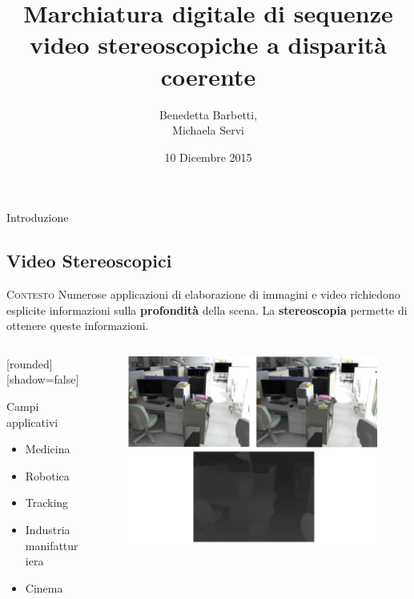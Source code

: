 \documentclass{beamer}
\title{Marchiatura digitale di sequenze video stereoscopiche a disparit\`{a} coerente }
\author{Benedetta Barbetti,\\ 
		Michaela Servi}
\institute{Universit\`{a} degli studi di Firenze}
\date{10 Dicembre 2015}
\begin{document}
\begin{frame}
\titlepage
\end{frame}

\begin{section}{Introduzione}
\subsection{Video Stereoscopici}

\begin{frame}[t]{\textsc{Contesto}}
\centering
Numerose applicazioni di elaborazione di immagini e video richiedono esplicite informazioni sulla \textbf{profondit\`{a}} della scena. La \textbf{stereoscopia} permette di ottenere queste informazioni.
\setlength{\columnsep}{0cm}
\begin{columns}
\begin{column}{4cm}
\begin{center}
[rounded][shadow=false]
\begin{block}{Campi applicativi}
		\begin{itemize}
			\item \small{Medicina} 
			\item Robotica
			\item Tracking
			\item Industria manifatturiera
			\item Cinema
		\end{itemize}	
	\end{block}
\end{center}
\end{column}
\begin{column}{6cm}
\begin{figure}
\centering
\includegraphics[width=1\linewidth]{./img/track.png}
\end{figure}
\end{column}
\end{columns}
\end{frame}



\end{section}
\end{document}
